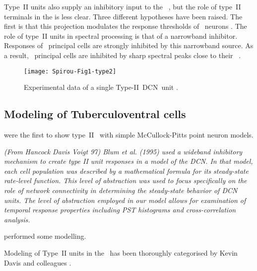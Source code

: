 \smallskip{}

Type~II units also supply an inhibitory input to the
\VCN~\citep{WickesbergOertel:1990}, but the role of type~II terminals in the
\VCN is less clear. Three different hypotheses have been raised. The ﬁrst is
that this projection modulates the response thresholds of \VCN~neurons
\citep{PaoliniClark:1998}.  The role of type~II units in spectral processing is
that of a narrowband inhibitor. Responses of \DCN~principal cells are strongly
inhibited by this narrowband source. As a result, \DCN~principal cells are
inhibited by sharp spectral peaks close to their
\BF~\citep{SpirouDavisEtAl:1999}.

\smallskip{}

\begin{figure}[htb]
  \centering
  \texttt{[image: Spirou-Fig1-type2]}
  \caption[Experimental data of a single Type-II~DCN~unit]{Experimental data of
    a single Type-II~DCN~unit \citep[Fig.~1]{SpirouDavisEtAl:1999}.}
  \label{fig:SpirouFig1}
\end{figure}


\subsection{Modeling of Tuberculoventral cells}


\citet{ArleKim:1991a} were the first to show type~II \EIRA~with simple
McCullock-Pitts point neuron models.


{\it (From Hancock Davis Voigt 97) Blum et al. (1995) used a wideband inhibitory
  mechanism to create type II unit responses in a model of the DCN. In that
  model, each cell population was described by a mathematical formula for its
  steady-state rate-level function. This level of abstraction was used to focus
  specifically on the role of network connectivity in determining the
  steady-state behavior of DCN units. The level of abstraction employed in our
  model allows for examination of temporal response properties including PST
  histograms and cross-correlation analysis.}

\citep{DunnVetterEtAl:1996} performed some modelling.


Modeling of Type~II units in the \DCN~has been thoroughly categorised by Kevin
Davis and colleagues \citep{YoungDavis:2002,HancockDavisEtAl:2001,DavisYoung:2000,SpirouDavisEtAl:1999,HancockDavisEtAl:1997,DavisVoigt:1996,DavisVoigt:1994,DavisVoigt:1991}.

